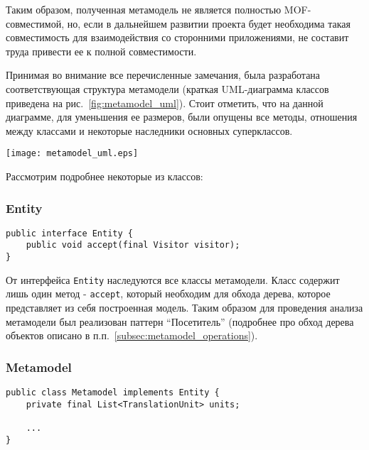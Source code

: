 Таким образом, полученная метамодель не является полностью MOF-совместимой, но,
если в дальнейшем развитии проекта будет необходима такая совместимость для
взаимодействия со сторонними приложениями, не составит труда привести ее к
полной совместимости.

Принимая во внимание все перечисленные замечания, была разработана
соответствующая структура метамодели (краткая UML-диаграмма классов приведена на
рис.~\ref{fig:metamodel_uml}). Стоит отметить, что на данной диаграмме, для
уменьшения ее размеров, были опущены все методы, отношения между классами и
некоторые наследники основных суперклассов.

\begin{sidewaysfigure}[!htbp]
    \begin{center}
        \texttt{[image: metamodel\_uml.eps]}
    \end{center}
    \caption{Упрощенная диаграмма классов метамодели}
    \label{fig:metamodel_uml}
\end{sidewaysfigure}

Рассмотрим подробнее некоторые из классов:

\subsubsection{Entity}

\begin{lstlisting}[caption={Интерфейс Entity}]
public interface Entity {
    public void accept(final Visitor visitor);
}
\end{lstlisting}

От интерфейса \texttt{Entity} наследуются все классы метамодели. Класс содержит
лишь один метод - \texttt{accept}, который необходим для обхода дерева, которое
представляет из себя построенная модель. Таким образом для проведения анализа
метамодели был реализован паттерн ``Посетитель'' (подробнее про обход
дерева объектов описано в п.п.~\ref{subsec:metamodel_operations}).

\newpage
\subsubsection{Metamodel}

\begin{lstlisting}[caption={Класс Metamodel}]
public class Metamodel implements Entity {
    private final List<TranslationUnit> units;

    ...
}
\end{lstlisting}


